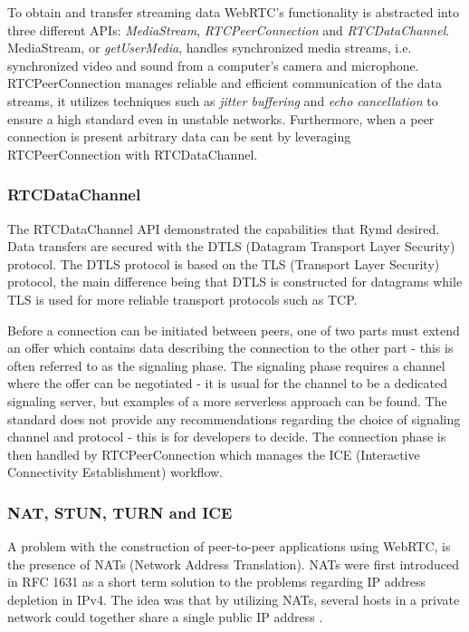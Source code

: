 To obtain and transfer streaming data WebRTC's functionality is abstracted into three different APIs: \emph{MediaStream}, \emph{RTCPeerConnection} and \emph{RTCDataChannel}\cite{WebRTCBasics:2012:Online}. MediaStream, or \emph{getUserMedia}, handles synchronized media streams, i.e. synchronized video and sound from a computer's camera and microphone. RTCPeerConnection manages reliable and efficient communication of the data streams, it utilizes techniques such as \emph{jitter buffering} and \emph{echo cancellation} to ensure a high standard even in unstable networks. Furthermore, when a peer connection is present arbitrary data can be sent by leveraging RTCPeerConnection with RTCDataChannel.

\subsubsection{RTCDataChannel}
The RTCDataChannel API demonstrated the capabilities that Rymd desired. Data transfers are secured with the DTLS (Datagram Transport Layer Security) protocol. The DTLS protocol is based on the TLS (Transport Layer Security) protocol, the main difference being that DTLS is constructed for datagrams while TLS is used for more reliable transport protocols such as TCP.

Before a connection can be initiated between peers, one of two parts must extend an offer which contains data describing the connection to the other part - this is often referred to as the signaling phase. The signaling phase requires a channel where the offer can be negotiated - it is usual for the channel to be a dedicated signaling server, but examples of a more serverless approach can be found\cite{webrtcsignalserver}. The standard does not provide any recommendations regarding the choice of signaling channel and protocol - this is for developers to decide. The connection phase is then handled by RTCPeerConnection which manages the ICE (Interactive Connectivity Establishment) workflow.

\subsubsection{NAT, STUN, TURN and ICE}
A problem with the construction of peer-to-peer applications using WebRTC, is the presence of NATs (Network Address Translation). NATs were first introduced in RFC 1631 as a short term solution to the problems regarding IP address depletion in IPv4. The idea was that by utilizing NATs, several hosts in a private network could together share a single public IP address \cite{RFC1631:Online}.

